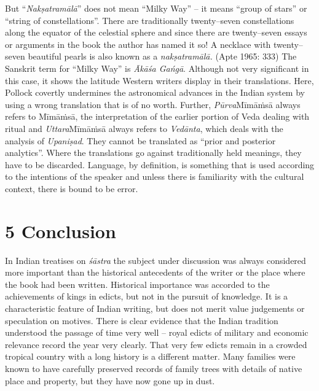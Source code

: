 But “\textit{Nakṣatramālā}” does not mean “Milky Way” – it means “group of stars” or “string of constellations”. There are traditionally twenty–seven constellations along the equator of the celestial sphere and since there are twenty–seven essays or arguments in the book the author has named it so! A necklace with twenty–seven beautiful pearls is also known as a \textit{nakṣatramālā.} (Apte 1965: 333) The Sanskrit term for “Milky Way” is \textit{Ākāśa Gańgā}. Although not very significant in this case, it shows the latitude Western writers display in their translations. Here, Pollock covertly undermines the astronomical advances in the Indian system by using a wrong translation that is of no worth. Further, \textit{Pūrva}Mīmāṁsā always refers to Mīmāṁsā, the interpretation of the earlier portion of Veda dealing with ritual and \textit{Uttara}Mīmāṁsā always refers to \textit{Vedānta}, which deals with the analysis of \textit{Upaniṣad}. They cannot be translated as “prior and posterior analytics”. Where the translations go against traditionally held meanings, they have to be discarded. Language, by definition, is something that is used according to the intentions of the speaker and unless there is familiarity with the cultural context, there is bound to be error.


\section*{5 Conclusion}

In Indian treatises on \textit{śāstra} the subject under discussion was always considered more important than the historical antecedents of the writer or the place where the book had been written. Historical importance was accorded to the achievements of kings in edicts, but not in the pursuit of knowledge. It is a characteristic feature of Indian writing, but does not merit value judgements or speculation on motives. There is clear evidence that the Indian tradition understood the passage of time very well – royal edicts of military and economic relevance record the year very clearly. That very few edicts remain in a crowded tropical country with a long history is a different matter. Many families were known to have carefully preserved records of family trees with details of native place and property, but they have now gone up in dust.

